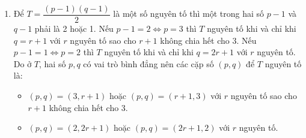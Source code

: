 \begin{bt}
{\begin{enumerate}
			Từ $ (1) $ và $ (2) $ suy ra
			$$ T=\dfrac{p(q-1)}{2}-\dfrac{q-1}{2}=\dfrac{(p-1)(q-1)}{2}. $$
			\item Để $ T= \dfrac{(p-1)(q-1)}{2}$ là một số nguyên tố thì một trong hai số $ p-1 $ và $ q-1 $ phải là 2 hoặc 1.
			Nếu $ p-1=2 \Leftrightarrow p=3$ thì $ T $ nguyên tố khi và chỉ khi $ q=r+1 $ với $ r $ nguyên tố sao cho $ r+1 $ không chia hết cho 3.
			Nếu $ p-1=1 \Leftrightarrow p=2$ thì $ T $ nguyên tố khi và chỉ khi $ q=2r+1 $ với $ r $ nguyên tố.
			Do ở $ T $, hai số $ p,q $ có vai trò bình đẳng nên các cặp số $ (p,q) $ để $ T $ nguyên tố là:
			\begin{itemize}
				\item $ (p,q) =(3,r+1)$ hoặc $ (p,q)=(r+1,3) $ với $ r $ nguyên tố sao cho $ r+1 $ không chia hết cho 3.
				\item $ (p,q) =(2,2r+1)$ hoặc $ (p,q)=(2r+1,2) $ với $ r $ nguyên tố.
			\end{itemize}
		\end{enumerate}
	}
\end{bt}

